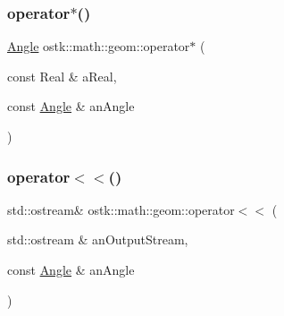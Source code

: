\subsubsection{\texorpdfstring{operator$\ast$()}{operator*()}}
{\footnotesize\ttfamily \hyperlink{classostk_1_1math_1_1geom_1_1_angle}{Angle} ostk\+::math\+::geom\+::operator$\ast$ (\begin{DoxyParamCaption}\item[{const Real \&}]{a\+Real,  }\item[{const \hyperlink{classostk_1_1math_1_1geom_1_1_angle}{Angle} \&}]{an\+Angle }\end{DoxyParamCaption})}

\mbox{\label{namespaceostk_1_1math_1_1geom_a060d2a5d248f324357820979408deba5}} 
\subsubsection{\texorpdfstring{operator$<$$<$()}{operator<<()}}
{\footnotesize\ttfamily std\+::ostream\& ostk\+::math\+::geom\+::operator$<$$<$ (\begin{DoxyParamCaption}\item[{std\+::ostream \&}]{an\+Output\+Stream,  }\item[{const \hyperlink{classostk_1_1math_1_1geom_1_1_angle}{Angle} \&}]{an\+Angle }\end{DoxyParamCaption})}

